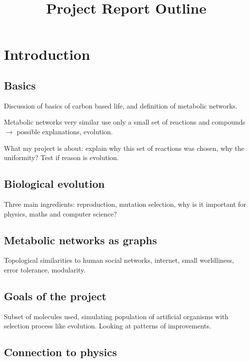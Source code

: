 \documentclass[]{article}
\title{Project Report Outline}
\author{}
\date{}
\begin{document}
\maketitle

\section{Introduction}
\label{sec:introduction}

\subsection{Basics}
\label{sub:basics}

Discussion of basics of carbon based life, and definition of metabolic networks.

Metabolic networks very similar use only a small set of reactions and compounds $\rightarrow$ possible explanations, evolution.

What my project is about: explain why this set of reactions was chosen, why the uniformity? Test if reason is evolution.

\subsection{Biological evolution}
\label{sub:About evolution}
Three main ingredients: reproduction, mutation selection, why is it important for physics, maths and computer science?

\subsection{Metabolic networks as graphs}
\label{sub:About Graph THeory}

Topological similarities to human social networks, internet, small worldliness, error tolerance, modularity. 

\subsection{Goals of the project}
\label{sub:What I will do}

Subset of molecules used, simulating population of artificial organisms with selection process like evolution. Looking at patterns of improvements.

\subsection{Connection to physics}
\label{sub:Where is the physics}
\end{document}
